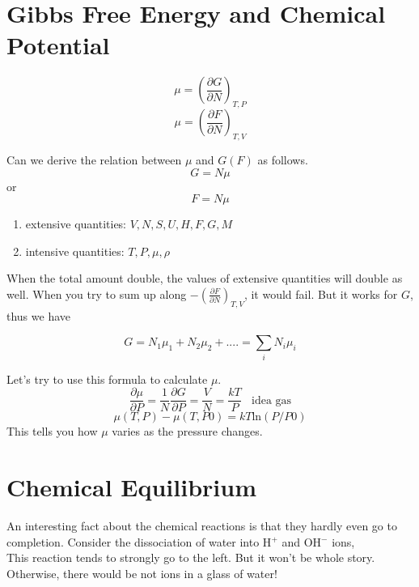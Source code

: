 

\section{Gibbs Free Energy and Chemical Potential}

\begin{equation}\mu  = (\frac{\partial {G}}{\partial {N}})_{T,P} \end{equation}
\begin{equation}\mu  = (\frac{\partial {F}}{\partial {N}})_{T,V} \end{equation}

Can we derive the relation between $\mu$ and $G(F)$ as follows.
\begin{equation} G = N\mu \end{equation}
or 
\begin{equation} F = N\mu \end{equation}

\begin{enumerate}
\item extensive quantities: $V, N, S, U, H, F, G, M$
\item intensive quantities: $T, P, \mu, \rho$
\end{enumerate}

When the total amount double, the values of extensive quantities will double as well. 
When you try to sum up along $-(\frac{\partial {F}}{\partial {N}})_{T,V}$, it would fail.
But it works for $G$, thus we have 

\begin{equation}G  = N_1\mu_1 + N_2\mu_2 + .... = \sum_i N_i\mu_i \end{equation}

Let's try to use this formula to calculate $\mu$. 
\begin{equation}\frac{\partial \mu}{\partial P} = \frac{1}{N} \frac{\partial G} {\partial P} = \frac{V}{N} = \frac{kT}{P} ~~~~\text{idea gas}\end{equation}
\begin{equation} \mu(T,P) - \mu(T,P0) = kT \text{ln}(P/P0) \end{equation}
This tells you how $\mu$ varies as the pressure changes.

\section{Chemical Equilibrium}
An interesting fact about the chemical reactions is that they hardly even go to completion. Consider the dissociation of water into
H$^+$ and OH$^-$ ions,
 \\
This reaction tends to strongly go to the left. But it won't be whole story. Otherwise, there would be not ions in a glass of water!

